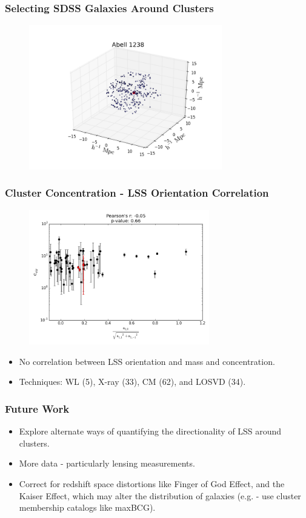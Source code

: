 \documentclass[hyperref={pdfpagelabels=false}]{beamer}
\begin{document}
\begin{frame}
  \frametitle{Selecting SDSS Galaxies Around Clusters}
  \begin{figure}
    \includegraphics[width=0.75\textwidth]{Abell1238.png}
  \end{figure}
\end{frame}

\begin{frame}
  \frametitle{Cluster Concentration - LSS Orientation Correlation}
  \begin{figure}
    \includegraphics[width=0.7\textwidth]{Conc_Corr2.png}
  \end{figure}
  \begin{itemize}
  \item No correlation between LSS orientation and mass and concentration.
  \item Techniques: WL (5), X-ray (33), CM (62), and LOSVD (34).
  \end{itemize}
\end{frame}

\begin{frame}
\frametitle{Future Work}
\begin{itemize}
\item Explore alternate ways of quantifying the directionality of LSS around clusters.
\item More data - particularly lensing measurements.
\item Correct for redshift space distortions like Finger of God Effect, and the
  Kaiser Effect, which may alter the distribution of galaxies (e.g. - use
  cluster membership catalogs like maxBCG).
\end{itemize}
\end{frame}
\end{document}
